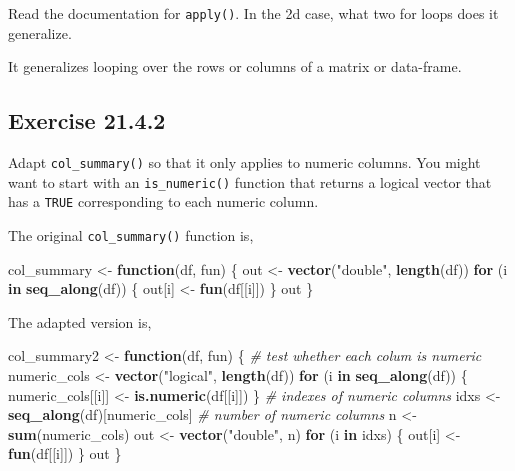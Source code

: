 \documentclass[]{book}
\newenvironment{Shaded}{\begin{snugshade}}{\end{snugshade}}
\newcommand{\CommentTok}[1]{\textcolor[rgb]{0.56,0.35,0.01}{\textit{#1}}}
\newcommand{\ControlFlowTok}[1]{\textcolor[rgb]{0.13,0.29,0.53}{\textbf{#1}}}
\newcommand{\KeywordTok}[1]{\textcolor[rgb]{0.13,0.29,0.53}{\textbf{#1}}}
\newcommand{\NormalTok}[1]{#1}
\newcommand{\StringTok}[1]{\textcolor[rgb]{0.31,0.60,0.02}{#1}}
\theoremstyle{plain}
\theoremstyle{remark}
\begin{document}
Read the documentation for \texttt{apply()}. In the 2d case, what two
for loops does it generalize.

It generalizes looping over the rows or columns of a matrix or
data-frame.

\hypertarget{exercise-21.4.2}{%
\subsection*{\texorpdfstring{Exercise
{21.4.2}}{Exercise 21.4.2}}\label{exercise-21.4.2}}

Adapt \texttt{col\_summary()} so that it only applies to numeric
columns. You might want to start with an \texttt{is\_numeric()} function
that returns a logical vector that has a \texttt{TRUE} corresponding to
each numeric column.

The original \texttt{col\_summary()} function is,

\begin{Shaded}
\begin{Highlighting}[]
\NormalTok{col_summary <-}\StringTok{ }\ControlFlowTok{function}\NormalTok{(df, fun) \{}
\NormalTok{  out <-}\StringTok{ }\KeywordTok{vector}\NormalTok{(}\StringTok{"double"}\NormalTok{, }\KeywordTok{length}\NormalTok{(df))}
  \ControlFlowTok{for}\NormalTok{ (i }\ControlFlowTok{in} \KeywordTok{seq_along}\NormalTok{(df)) \{}
\NormalTok{    out[i] <-}\StringTok{ }\KeywordTok{fun}\NormalTok{(df[[i]])}
\NormalTok{  \}}
\NormalTok{  out}
\NormalTok{\}}
\end{Highlighting}
\end{Shaded}

The adapted version is,

\begin{Shaded}
\begin{Highlighting}[]
\NormalTok{col_summary2 <-}\StringTok{ }\ControlFlowTok{function}\NormalTok{(df, fun) \{}
  \CommentTok{# test whether each colum is numeric}
\NormalTok{  numeric_cols <-}\StringTok{ }\KeywordTok{vector}\NormalTok{(}\StringTok{"logical"}\NormalTok{, }\KeywordTok{length}\NormalTok{(df))}
  \ControlFlowTok{for}\NormalTok{ (i }\ControlFlowTok{in} \KeywordTok{seq_along}\NormalTok{(df)) \{}
\NormalTok{    numeric_cols[[i]] <-}\StringTok{ }\KeywordTok{is.numeric}\NormalTok{(df[[i]])}
\NormalTok{  \}}
  \CommentTok{# indexes of numeric columns}
\NormalTok{  idxs <-}\StringTok{ }\KeywordTok{seq_along}\NormalTok{(df)[numeric_cols]}
  \CommentTok{# number of numeric columns}
\NormalTok{  n <-}\StringTok{ }\KeywordTok{sum}\NormalTok{(numeric_cols)}
\NormalTok{  out <-}\StringTok{ }\KeywordTok{vector}\NormalTok{(}\StringTok{"double"}\NormalTok{, n)}
  \ControlFlowTok{for}\NormalTok{ (i }\ControlFlowTok{in}\NormalTok{ idxs) \{}
\NormalTok{    out[i] <-}\StringTok{ }\KeywordTok{fun}\NormalTok{(df[[i]])}
\NormalTok{  \}}
\NormalTok{  out}
\NormalTok{\}}
\end{Highlighting}
\end{Shaded}
\end{document}
